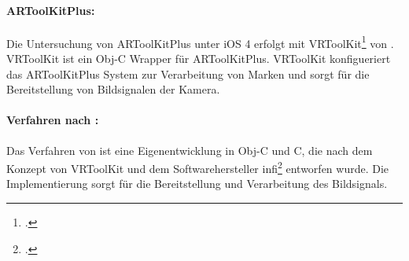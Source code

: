 \paragraph{ARToolKitPlus:} %
\label{par:artoolkitplus}
Die Untersuchung von ARToolKitPlus unter iOS 4 erfolgt mit VRToolKit\footcite[Vgl.][]{vrtoolkit} von \citeauthor{vrtoolkit}. VRToolKit ist ein Obj-C Wrapper für ARToolKitPlus. VRToolKit konfigueriert das ARToolKitPlus System zur Verarbeitung von Marken und sorgt für die Bereitstellung von Bildsignalen der Kamera.

\paragraph{Verfahren nach \citeauthor{hirzer08}:} %
\label{par:verfahren_nach_hirzer}
Das Verfahren von \citeauthor{hirzer08} ist eine Eigenentwicklung in Obj-C und C, die nach dem Konzept von VRToolKit und
 dem Softwarehersteller infi\footcite[Vgl.][]{infi} entworfen wurde. Die Implementierung sorgt für die Bereitstellung
 und Verarbeitung des Bildsignals.

